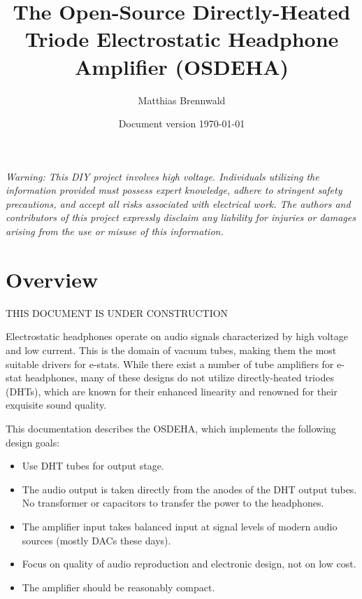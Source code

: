 





\title{The Open-Source Directly-Heated Triode Electrostatic Headphone Amplifier (OSDEHA)}
\author{Matthias Brennwald}
\date{Document version \today}




\maketitle

\emph{Warning: This DIY project involves high voltage. Individuals utilizing the information provided must possess expert knowledge, adhere to stringent safety precautions, and accept all risks associated with electrical work. The authors and contributors of this project expressly disclaim any liability for injuries or damages arising from the use or misuse of this information.}


\section{Overview}

THIS DOCUMENT IS UNDER CONSTRUCTION

Electrostatic headphones operate on audio signals characterized by high voltage and low current. This is the domain of vacuum tubes, making them the most suitable drivers for e-stats.  While there exist a number of tube amplifiers for e-stat headphones, many of these designs do not utilize directly-heated triodes (DHTs), which are known for their enhanced linearity and renowned for their exquisite sound quality.\par

This documentation describes the OSDEHA, which implements the following design goals:
\begin{itemize}
\item Use DHT tubes for output stage.
\item The audio output is taken directly from the anodes of the DHT output tubes. No transformer or capacitors to transfer the power to the headphones.
\item The amplifier input takes balanced input at signal levels of modern audio sources (mostly DACs these days).
\item Focus on quality of audio reproduction and electronic design, not on low cost.
\item The amplifier should be reasonably compact.
\end{itemize}

